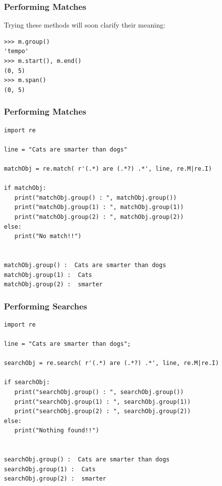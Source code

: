  \begin{frame}[fragile]
\frametitle{Performing Matches } 
Trying these methods will soon clarify their meaning:
\begin{lstlisting}
>>> m.group()
'tempo'
>>> m.start(), m.end()
(0, 5)
>>> m.span()
(0, 5)
\end{lstlisting}

\end{frame}

 \begin{frame}[fragile]
\frametitle{Performing Matches } 
\begin{lstlisting}
import re

line = "Cats are smarter than dogs"

matchObj = re.match( r'(.*) are (.*?) .*', line, re.M|re.I)

if matchObj:
   print("matchObj.group() : ", matchObj.group())
   print("matchObj.group(1) : ", matchObj.group(1))
   print("matchObj.group(2) : ", matchObj.group(2))
else:
   print("No match!!")


matchObj.group() :  Cats are smarter than dogs
matchObj.group(1) :  Cats
matchObj.group(2) :  smarter   
\end{lstlisting}

\end{frame}

 \begin{frame}[fragile]
\frametitle{Performing Searches } 
\begin{lstlisting}
import re

line = "Cats are smarter than dogs";

searchObj = re.search( r'(.*) are (.*?) .*', line, re.M|re.I)

if searchObj:
   print("searchObj.group() : ", searchObj.group())
   print("searchObj.group(1) : ", searchObj.group(1))
   print("searchObj.group(2) : ", searchObj.group(2))
else:
   print("Nothing found!!")


searchObj.group() :  Cats are smarter than dogs
searchObj.group(1) :  Cats
searchObj.group(2) :  smarter
\end{lstlisting}

\end{frame}

